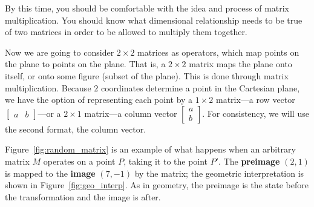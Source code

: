 \documentclass[../gatm.tex]{subfiles}
\begin{document}
\noindent By this time, you should be comfortable with the idea and process of matrix multiplication. You should know what dimensional relationship needs to be true of two matrices in order to be allowed to multiply them together.

Now we are going to consider $2\times 2$ matrices as operators, which map points on the plane to points on the plane. That is, a $2\times 2$ matrix maps the plane onto itself, or onto some figure (subset of the plane). This is done through matrix multiplication. Because $2$ coordinates determine a point in the Cartesian plane, we have the option of representing each point by a $1\times 2$ matrix---a row vector $\left[\begin{array}{cc}a & b \end{array}\right]$---or a $2\times 1$ matrix---a column vector $\left[\begin{smallmatrix}a \\ b \end{smallmatrix}\right]$. For consistency, we will use the second format, the column vector.

Figure~\ref{fig:random_matrix} is an example of what happens when an arbitrary matrix $M$ operates on a point $P$, taking it to the point $P'$. The \textbf{preimage} $(2,1)$ is mapped to the \textbf{image} $(7, -1)$ by the matrix; the geometric interpretation is shown in Figure~\ref{fig:geo_interp}. As in geometry, the preimage is the state before the transformation and the image is after.

\end{document}
